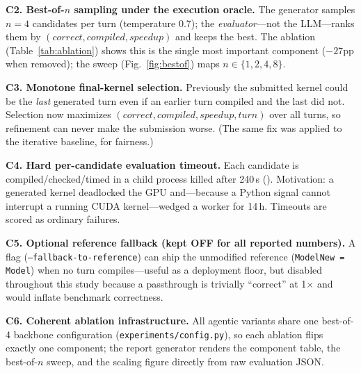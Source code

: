 \documentclass[conference]{IEEEtran}
\begin{document}
\textbf{C2. Best-of-$n$ sampling under the execution oracle.}
The generator samples $n{=}4$ candidates per turn (temperature 0.7); the
\emph{evaluator}---not the LLM---ranks them by
$(\textit{correct},\textit{compiled},\textit{speedup})$ and keeps the best.
The ablation (Table~\ref{tab:ablation}) shows this is the single most important
component ($-27$pp when removed); the sweep (Fig.~\ref{fig:bestof}) maps
$n\in\{1,2,4,8\}$.

\textbf{C3. Monotone final-kernel selection.}
Previously the submitted kernel could be the \emph{last} generated turn even if an
earlier turn compiled and the last did not. Selection now maximizes
$(\textit{correct},\textit{compiled},\textit{speedup},\textit{turn})$ over all
turns, so refinement can never make the submission worse. (The same fix was applied
to the iterative baseline, for fairness.)

\textbf{C4. Hard per-candidate evaluation timeout.}
Each candidate is compiled/checked/timed in a child process killed after 240\,s
(). Motivation: a generated
kernel deadlocked the GPU and---because a Python signal cannot interrupt a running
CUDA kernel---wedged a worker for 14\,h. Timeouts are scored as ordinary failures.

\textbf{C5. Optional reference fallback (kept OFF for all reported numbers).}
A flag (\texttt{--fallback-to-reference}) can ship the unmodified reference
(\texttt{ModelNew = Model}) when no turn compiles---useful as a deployment floor,
but disabled throughout this study because a passthrough is trivially ``correct''
at 1$\times$ and would inflate benchmark correctness.

\textbf{C6. Coherent ablation infrastructure.}
All agentic variants share one best-of-4 backbone configuration
(\texttt{experiments/config.py}), so each ablation flips exactly one component;
the report generator renders the component table, the best-of-$n$ sweep, and the
scaling figure directly from raw evaluation JSON.
\end{document}
